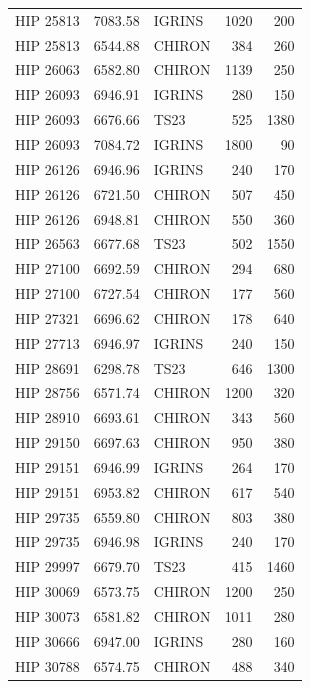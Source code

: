 \begin{scriptsize}
\begin{longtable}{|l|rlrr|}
   HIP 25813 &  7083.58 &     IGRINS &     1020 &   200 \\
   HIP 25813 &  6544.88 &     CHIRON &      384 &   260 \\
   HIP 26063 &  6582.80 &     CHIRON &     1139 &   250 \\
   HIP 26093 &  6946.91 &     IGRINS &      280 &   150 \\
   HIP 26093 &  6676.66 &       TS23 &      525 &  1380 \\
   HIP 26093 &  7084.72 &     IGRINS &     1800 &    90 \\
   HIP 26126 &  6946.96 &     IGRINS &      240 &   170 \\
   HIP 26126 &  6721.50 &     CHIRON &      507 &   450 \\
   HIP 26126 &  6948.81 &     CHIRON &      550 &   360 \\
   HIP 26563 &  6677.68 &       TS23 &      502 &  1550 \\
   HIP 27100 &  6692.59 &     CHIRON &      294 &   680 \\
   HIP 27100 &  6727.54 &     CHIRON &      177 &   560 \\
   HIP 27321 &  6696.62 &     CHIRON &      178 &   640 \\
   HIP 27713 &  6946.97 &     IGRINS &      240 &   150 \\
   HIP 28691 &  6298.78 &       TS23 &      646 &  1300 \\
   HIP 28756 &  6571.74 &     CHIRON &     1200 &   320 \\
   HIP 28910 &  6693.61 &     CHIRON &      343 &   560 \\
   HIP 29150 &  6697.63 &     CHIRON &      950 &   380 \\
   HIP 29151 &  6946.99 &     IGRINS &      264 &   170 \\
   HIP 29151 &  6953.82 &     CHIRON &      617 &   540 \\
   HIP 29735 &  6559.80 &     CHIRON &      803 &   380 \\
   HIP 29735 &  6946.98 &     IGRINS &      240 &   170 \\
   HIP 29997 &  6679.70 &       TS23 &      415 &  1460 \\
   HIP 30069 &  6573.75 &     CHIRON &     1200 &   250 \\
   HIP 30073 &  6581.82 &     CHIRON &     1011 &   280 \\
   HIP 30666 &  6947.00 &     IGRINS &      280 &   160 \\
   HIP 30788 &  6574.75 &     CHIRON &      488 &   340 \\

\end{longtable}
\end{scriptsize}
